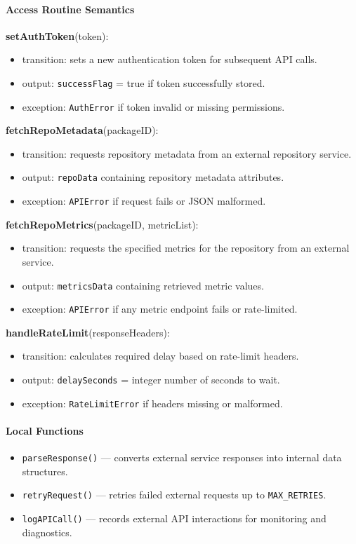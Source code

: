 \documentclass[12pt, titlepage]{article}
\begin{document}
\paragraph{Access Routine Semantics}

\noindent \textbf{setAuthToken}(token):
\begin{itemize}
  \item transition: sets a new authentication token for subsequent API calls.
  \item output: \texttt{successFlag} = true if token successfully stored.
  \item exception: \texttt{AuthError} if token invalid or missing permissions.
\end{itemize}

\noindent \textbf{fetchRepoMetadata}(packageID):
\begin{itemize}
  \item transition: requests repository metadata from an external repository service.
  \item output: \texttt{repoData} containing repository metadata attributes.
  \item exception: \texttt{APIError} if request fails or JSON malformed.
\end{itemize}

\noindent \textbf{fetchRepoMetrics}(packageID, metricList):
\begin{itemize}
  \item transition: requests the specified metrics for the repository from an external service.
  \item output: \texttt{metricsData} containing retrieved metric values.
  \item exception: \texttt{APIError} if any metric endpoint fails or rate-limited.
\end{itemize}

\noindent \textbf{handleRateLimit}(responseHeaders):
\begin{itemize}
  \item transition: calculates required delay based on rate-limit headers.
  \item output: \texttt{delaySeconds} = integer number of seconds to wait.
  \item exception: \texttt{RateLimitError} if headers missing or malformed.
\end{itemize}

\paragraph{Local Functions}
\begin{itemize}
  \item \texttt{parseResponse()} — converts external service responses into internal data structures.
  \item \texttt{retryRequest()} — retries failed external requests up to \texttt{MAX\_RETRIES}.
  \item \texttt{logAPICall()} — records external API interactions for monitoring and diagnostics.
\end{itemize}
\end{document}
